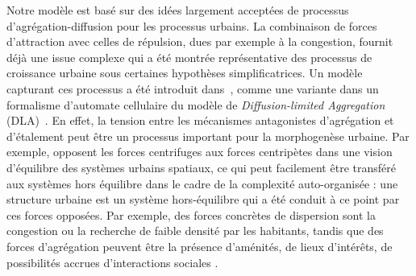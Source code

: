 {Notre modèle est basé sur des idées largement acceptées de processus d'agrégation-diffusion pour les processus urbains. La combinaison de forces d'attraction avec celles de répulsion, dues par exemple à la congestion, fournit déjà une issue complexe qui a été montrée représentative des processus de croissance urbaine sous certaines hypothèses simplificatrices. Un modèle capturant ces processus a été introduit dans~\cite{batty2006hierarchy}, comme une variante dans un formalisme d'automate cellulaire du modèle de \emph{Diffusion-limited Aggregation} (DLA)~\cite{batty1991generating}. En effet, la tension entre les mécanismes antagonistes d'agrégation et d'étalement peut être un processus important pour la morphogenèse urbaine. Par exemple, \cite{fujita1996economics} opposent les forces centrifuges aux forces centripètes dans une vision d'équilibre des systèmes urbains spatiaux, ce qui peut facilement être transféré aux systèmes hors équilibre dans le cadre de la complexité auto-organisée : une structure urbaine est un système hors-équilibre qui a été conduit à ce point par ces forces opposées. Par exemple, des forces concrètes de dispersion sont la congestion ou la recherche de faible densité par les habitants, tandis que des forces d'agrégation peuvent être la présence d'aménités, de lieux d'intérêts, de possibilités accrues d'interactions sociales \cite{krugman1992dynamic}.
}


